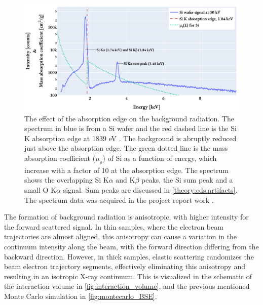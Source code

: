 \begin{figure}[pht]
    \centering
    \includegraphics[width=0.95\linewidth]{figures/background_absorptionEdge_Si.pdf}
    \caption{
        The effect of the absorption edge on the background radiation.
        The spectrum in blue is from a Si wafer and the red dashed line is the Si K absorption edge at 1839 eV \cite{absorptionEdges_1967,hyperspy_1.7.1}.
        The background is abruptly reduced just above the absorption edge.
        The green dotted line is the mass absorption coefficient ($\mu_\rho$) of Si as a function of energy, which increase with a factor of 10 at the absorption edge.
        The spectrum shows the overlapping Si K$\alpha$ and K$\beta$ peaks, the Si sum peak and a small O K$\alpha$ signal.
        Sum peaks are discussed in \cref{theory:eds:artifacts}.
        The spectrum data was acquired in the project report work \cite{project_report}.
    }
    \label{fig:background_absorptionEdgeSi}
\end{figure}




The formation of background radiation is anisotropic, with higher intensity for the forward scattered signal.
In thin samples, where the electron beam trajectories are almost aligned, this anisotropy can cause a variation in the continuum intensity along the beam, with the forward direction differing from the backward direction.
However, in thick samples, elastic scattering randomizes the beam electron trajectory segments, effectively eliminating this anisotropy and resulting in an isotropic X-ray continuum.
This is visualized in the schematic of the interaction volume in \cref{fig:interaction_volume}, and the previous mentioned Monte Carlo simulation in \cref{fig:montecarlo_BSE}.



